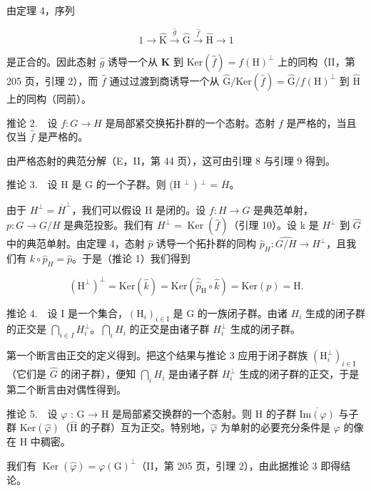 由定理 4，序列

\[
1 \to \widehat {\mathrm{K}} \xrightarrow {\widehat {g}} \widehat {\mathrm{G}} \xrightarrow {\widehat {f}} \widehat {\mathrm{H}} \to 1\tag{32}
\]

是正合的。因此态射 \(\widehat{g}\) 诱导一个从 \(\widehat{\mathbf{K}}\) 到 \(\mathrm{Ker}(\widehat{f}) = f(\mathrm{H})^{\perp}\) 上的同构（II，第 205 页，引理 2），而 \(\widehat{f}\) 通过过渡到商诱导一个从 \(\widehat{\mathrm{G}} / \mathrm{Ker}(\widehat{f}) = \widehat{\mathrm{G}} / f(\mathrm{H})^{\perp}\) 到 \(\widehat{\mathrm{H}}\) 上的同构（同前）。

推论 2.　设 \(f\colon G\to H\) 是局部紧交换拓扑群的一个态射。态射 \(f\) 是严格的，当且仅当 \(\widehat{f}\) 是严格的。

由严格态射的典范分解（E，II，第 44 页），这可由引理 8 与引理 9 得到。

推论 3.　设 H 是 G 的一个子群。则 (H \(^{\perp}\) ) \(^{\perp}\) = \(\overline{H}\)。

由于 \(H^{\perp} = \overline{H}^{\perp}\)，我们可以假设 H 是闭的。设 \(f: H \to G\) 是典范单射，\(p: G \to G/H\) 是典范投影。我们有 \(H^{\perp} = \operatorname{Ker}(\widehat{f})\)（引理 10）。设 k 是 \(H^{\perp}\) 到 \(\widehat{G}\) 中的典范单射。由定理 4，态射 \(\widehat{p}\) 诱导一个拓扑群的同构 \(\widehat{p}_{H}: \widehat{G/H} \to H^{\perp}\)，且我们有 \(k \circ \widehat{p}_{H} = \widehat{p}\)。于是（推论 1）我们得到

\[
(\mathrm{H} ^ {\perp}) ^ {\perp} = \mathrm{Ker} (\widehat {k}) = \mathrm{Ker} (\widehat {\widehat {p}} _ {\mathrm{H}} \circ \widehat {k}) = \mathrm{Ker} (p) = \mathrm{H}.
\]

推论 4.　设 I 是一个集合，\((\mathrm{H}_{i})_{i\in\mathrm{I}}\) 是 G 的一族闭子群。由诸 \(H_{i}\) 生成的闭子群的正交是 \(\bigcap_{i\in I}H_{i}^{\perp}\)。\(\bigcap_{i}H_{i}\) 的正交是由诸子群 \(H_{i}^{\perp}\) 生成的闭子群。

第一个断言由正交的定义得到。把这个结果与推论 3 应用于闭子群族 \((\mathrm{H}_{i}^{\perp})_{i\in\mathrm{I}}\)（它们是 \(\widehat{G}\) 的闭子群），便知 \(\bigcap_{i}H_{i}\) 是由诸子群 \(H_{i}^{\perp}\) 生成的闭子群的正交，于是第二个断言由对偶性得到。

推论 5.　设 \(\varphi\) : G → H 是局部紧交换群的一个态射。则 H 的子群 \(\overline{\text{Im}(\varphi)}\) 与子群 \(\text{Ker}(\widehat{\varphi})\)（\(\widehat{\text{H}}\) 的子群）互为正交。特别地，\(\widehat{\varphi}\) 为单射的必要充分条件是 \(\varphi\) 的像在 H 中稠密。

我们有 \(\operatorname{Ker}(\widehat{\varphi}) = \varphi(\mathrm{G})^{\perp}\)（II，第 205 页，引理 2），由此据推论 3 即得结论。

